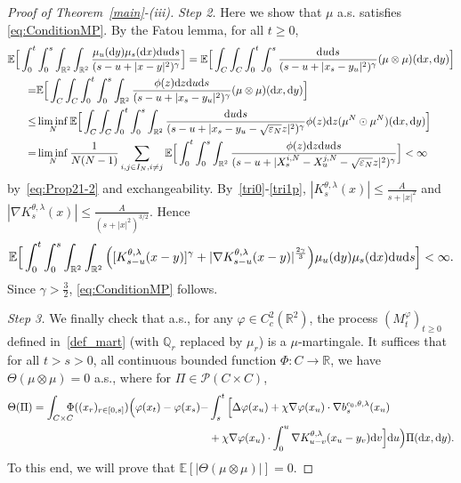 \documentclass[11pt]{article}
\newcommand{\E}{\mathbb{E}}
\newcommand{\R}{\mathbb{R}}
\newcommand{\Q}{\mathbb{Q}}
\newcommand{\1}{\mathbbm{1}}
\newcommand{\dd}{{\rm d}}
\newcommand{\Pp}{\mathcal P}
\newcommand{\e}{\varepsilon}
\newcommand{\vip}{\vskip5pt}
\begin{document}
\begin{proof}[Proof of Theorem~\ref{main}-(iii)]
{\it Step 2.} Here we show that $\mu$ a.s. satisfies \eqref{eq:ConditionMP}.
By the Fatou lemma, for all $t\geq 0$,
\begin{align*}
\E\Big[\int_0^t& \int_0^s \int_{\R^2} \int_{\R^2}  
\frac {\mu_u(\dd y)\mu_s(\dd x) \dd u \dd s}{({s-u}+|x-y|^2)^\gamma}\Big]
= \E\Big[\int_C\int_C\int_0^t \int_0^s  \frac { \dd u \dd s}{({s-u}+|x_s-y_u|^2)^\gamma}(\mu\otimes \mu)
(\dd x,\dd y)\Big]\\
=&\E\Big[\int_C\int_C\int_0^t \int_0^s \int_{\R^2} \frac {\phi(z)\dd z \dd u \dd s}{({s-u}+|x_s-y_u|^2)^\gamma}(\mu\otimes \mu)
(\dd x,\dd y)\Big] \\
\leq & \liminf_N \E\Big[\int_C\int_C\int_0^t \int_0^s \int_{\R^2}\frac { \dd u  \dd s}{({s-u}+|x_s-y_u-\sqrt{\e_N}z|^2)^\gamma} \phi(z)\dd z
(\mu^N \odot \mu^N) (\dd x,\dd y) \Big]\\
=& \liminf_N \frac 1{N(N-1)}\sum_{i,j \in I_N,i\neq j}\E\Big[\int_0^t \int_0^s \int_{\R^2}\frac {\phi(z)\dd z\dd u  \dd s}
{({s-u}+|X^{i,N}_s-X^{j,N}_u-\sqrt{\e_N}z|^2)^\gamma}\Big]<\infty
\end{align*}
by~\eqref{eq:Prop21-2} and exchangeability. By~\eqref{tri0}-\eqref{tri1p}, $|K^{\theta,\lambda}_s(x)| \leq \frac{A}{s+|x|^2}$ and $|\nabla K^{\theta,\lambda}_s(x)| \leq \frac{A}{(s+|x|^2)^{3/2}}$. Hence
\begin{equation}\label{tbrr}
\E\Big[\int_0^t \int_0^s \int_{\R^2} \int_{\R^2} \Big([K^{\theta,\lambda}_{s-u}(x-y)]^{\gamma} +|\nabla K^{\theta,\lambda}_{s-u}(x-y)|^{\frac{2\gamma}3}\Big) \mu_u(\dd y)\mu_s(\dd x) \dd u \dd s  \Big]<\infty.
\end{equation}
Since $\gamma>\frac 32$, \eqref{eq:ConditionMP} follows.

\vip

{\it Step 3.} We finally check that a.s., for any $\varphi\in C^2_c(\R^2)$, the process $(M_t^\varphi)_{t\geq 0}$ 
defined in~\eqref{def_mart} (with $\Q_r$ replaced by $\mu_r$) is a $\mu$-martingale. It suffices that for all $t>s>0$, 
all continuous bounded function $\Phi:C\to \R$, we have $\Theta(\mu\otimes\mu)=0$ a.s., where
for $\Pi \in \Pp(C\times C)$,
\begin{align*}
\Theta(\Pi)=\int_{C\times C}\!\!\!\!\!
\Phi((x_r)_{r\in [0,s]})
\Big(\varphi(x_t)-\varphi(x_s)-&
\int_s^t \Big[ \Delta \varphi(x_u) + \chi \nabla \varphi(x_u)\cdot \nabla b^{c_0,\theta,\lambda}_s(x_u)\\
&+\chi \nabla \varphi(x_u)\cdot  \int_0^u \nabla K^{\theta,\lambda}_{u-v}(x_u-y_v) \dd v \Big]\dd u \Big) 
\Pi(\dd x,\dd y).
\end{align*}
To this end, we will prove that $\E[|\Theta(\mu\otimes\mu)|]=0$.
\vip


\end{proof}
\end{document}
